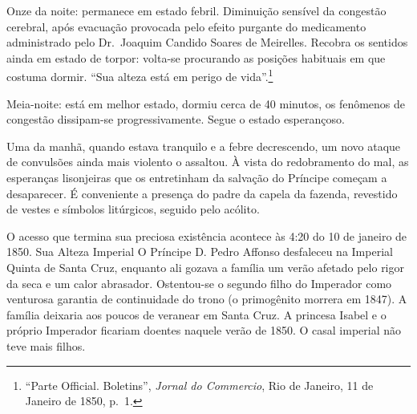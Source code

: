 Onze da noite: permanece em estado febril. Diminuição sensível da
congestão cerebral, após evacuação provocada pelo efeito purgante do
medicamento administrado pelo Dr.~Joaquim Candido Soares de Meirelles.
Recobra os sentidos ainda em estado de torpor: volta-se procurando as
posições habituais em que costuma dormir. ``Sua alteza está em perigo de
vida''.\footnote{``Parte Official. Boletins'', \textit{Jornal do
  Commercio}, Rio de Janeiro, 11 de Janeiro de 1850, p.~1.}

Meia-noite: está em melhor estado, dormiu cerca de 40 minutos, os
fenômenos de congestão dissipam-se progressivamente. Segue o estado
esperançoso.

Uma da manhã, quando estava tranquilo e a febre decrescendo, um novo
ataque de convulsões ainda mais violento o assaltou. À vista do
redobramento do mal, as esperanças lisonjeiras que os entretinham da
salvação do Príncipe começam a desaparecer. É conveniente a presença do
padre da capela da fazenda, revestido de vestes e símbolos litúrgicos,
seguido pelo acólito.

O acesso que termina sua preciosa existência acontece às 4:20 do 10 de
janeiro de 1850. Sua Alteza Imperial O Príncipe D. Pedro Affonso
desfaleceu na Imperial Quinta de Santa Cruz, enquanto ali gozava a
família um verão afetado pelo rigor da seca e um calor abrasador.
Ostentou-se o segundo filho do Imperador como venturosa garantia de
continuidade do trono (o primogênito morrera em 1847). A família
deixaria aos poucos de veranear em Santa Cruz. A princesa Isabel e o
próprio Imperador ficariam doentes naquele verão de 1850. O casal
imperial não teve mais filhos.

